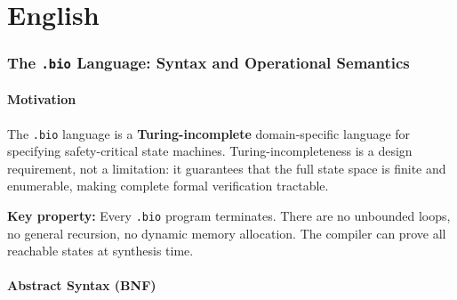 \documentclass[11pt,a4paper,twoside]{article}
\begin{document}
\newpage
\tableofcontents
\newpage

\part{English}

\section{The \texttt{.bio} Language: Syntax and Operational Semantics}

\subsection{Motivation}

The \texttt{.bio} language is a \textbf{Turing-incomplete} domain-specific language
for specifying safety-critical state machines. Turing-incompleteness is a design
requirement, not a limitation: it guarantees that the full state space is finite and
enumerable, making complete formal verification tractable.

\begin{mdframed}[style=notebox]
\textbf{Key property:} Every \texttt{.bio} program terminates. There are no
unbounded loops, no general recursion, no dynamic memory allocation. The compiler
can prove all reachable states at synthesis time.
\end{mdframed}

\subsection{Abstract Syntax (BNF)}
\end{document}
